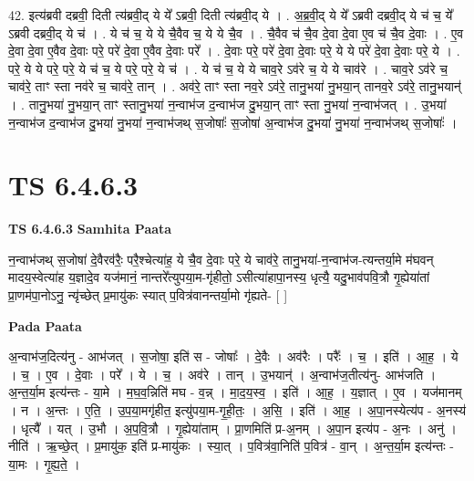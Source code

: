 \documentclass[17pt]{extarticle}
\begin{document}
42. इत्य॑ब्रवी दब्रवी॒ दिती त्य॑ब्रवी॒द् ये ये᳚ ऽब्रवी॒ दिती त्य॑ब्रवी॒द् ये । . अ॒ब्र॒वी॒द् ये ये᳚ ऽब्रवी दब्रवी॒द् ये च॑ च॒ ये᳚ ऽब्रवी दब्रवी॒द् ये च॑ । . ये च॑ च॒ ये ये चै॒वैव च॒ ये ये चै॒व । . चै॒वैव च॑ चै॒व दे॒वा दे॒वा ए॒व च॑ चै॒व दे॒वाः । . ए॒व दे॒वा दे॒वा ए॒वैव दे॒वाः परे॒ परे॑ दे॒वा ए॒वैव दे॒वाः परे᳚ । . दे॒वाः परे॒ परे॑ दे॒वा दे॒वाः परे॒ ये ये परे॑ दे॒वा दे॒वाः परे॒ ये । . परे॒ ये ये परे॒ परे॒ ये च॑ च॒ ये परे॒ परे॒ ये च॑ । . ये च॑ च॒ ये ये चाव॒रे ऽव॑रे च॒ ये ये चाव॑रे । . चाव॒रे ऽव॑रे च॒ चाव॑रे॒ ताꣳ स्ता नव॑रे च॒ चाव॑रे॒ तान् । . अव॑रे॒ ताꣳ स्ता नव॒रे ऽव॑रे॒ तानु॒भया॑ नु॒भया॒न् तानव॒रे ऽव॑रे॒ तानु॒भयान्॑ । . तानु॒भया॑ नु॒भया॒न् ताꣳ स्तानु॒भया॑ न॒न्वाभ॑ज द॒न्वाभ॑ज दु॒भया॒न् ताꣳ स्ता नु॒भया॑ न॒न्वाभ॑जत् । . उ॒भया॑ न॒न्वाभ॑ज द॒न्वाभ॑ज दु॒भया॑ नु॒भया॑ न॒न्वाभ॑जथ् स॒जोषाः᳚ स॒जोषा॑ अ॒न्वाभ॑ज दु॒भया॑ नु॒भया॑ न॒न्वाभ॑जथ् स॒जोषाः᳚ । \newline
\pagebreak
{}

\section{ TS 6.4.6.3 }

\textbf{TS 6.4.6.3 } \newline
\textbf{Samhita Paata} \newline

न॒न्वाभ॑जथ् स॒जोषा॑ दे॒वैरव॑रैः॒ परै॒श्चेत्या॑ह॒ ये चै॒व दे॒वाः परे॒ ये चाव॑रे॒ तानु॒भया॑-न॒न्वाभ॑ज-त्यन्तर्या॒मे म॑घवन् मादय॒स्वेत्या॑ह य॒ज्ञादे॒व यज॑मानं॒ नान्तरे᳚त्युपया॒म-गृ॑हीतो॒ ऽसीत्या॑हापा॒नस्य॒ धृत्यै॒ यदु॒भाव॑पवि॒त्रौ गृ॒ह्येया॑तां प्रा॒णम॑पा॒नोऽनु॒ न्यृ॑च्छेत् प्र॒मायु॑कः स्यात् प॒वित्र॑वानन्तर्या॒मो गृ॑ह्यते- [  ] \newline

\textbf{Pada Paata} \newline

अ॒न्वाभ॑ज॒दित्य॑नु - आभ॑जत् । स॒जोषा॒ इति॑ स - जोषाः᳚ । दे॒वैः । अव॑रैः । परैः᳚ । च॒ । इति॑ । आ॒ह॒ । ये । च॒ । ए॒व । दे॒वाः । परे᳚ । ये । च॒ । अव॑रे । तान् । उ॒भयान्॑ । अ॒न्वाभ॑ज॒तीत्य॑नु- आभ॑जति । अ॒न्त॒र्या॒म इत्य॑न्तः - या॒मे । म॒घ॒व॒न्निति॑ मघ - व॒न्न् । मा॒द॒य॒स्व॒ । इति॑ । आ॒ह॒ । य॒ज्ञात् । ए॒व । यज॑मानम् । न । अ॒न्तः । ए॒ति॒ । उ॒प॒या॒मगृ॑हीत॒ इत्यु॑पया॒म-गृ॒ही॒तः॒ । अ॒सि॒ । इति॑ । आ॒ह॒ । अ॒पा॒नस्येत्य॑प - अ॒नस्य॑ । धृत्यै᳚ । यत् । उ॒भौ । अ॒प॒वि॒त्रौ । गृ॒ह्येया॑ताम् । प्रा॒णमिति॑ प्र-अ॒नम् । अ॒पा॒न इत्य॑प - अ॒नः । अनु॑ । नीति॑ । ऋ॒च्छे॒त् । प्र॒मायु॑क॒ इति॑ प्र-मायु॑कः । स्या॒त् । प॒वित्र॑वा॒निति॑ प॒वित्र॑ - वा॒न् । अ॒न्त॒र्या॒म इत्य॑न्तः - या॒मः । गृ॒ह्य॒ते॒ ।  \newline
\end{document}
